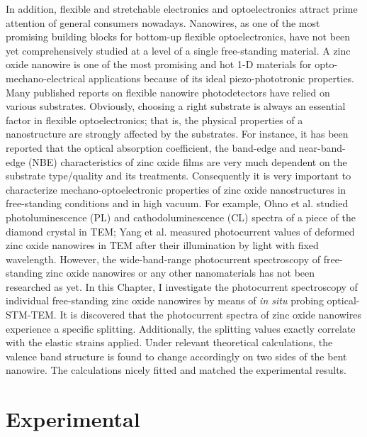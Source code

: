 In addition, flexible and stretchable electronics and optoelectronics attract prime attention of general consumers nowadays. 
Nanowires, as one of the most promising building blocks for bottom-up flexible optoelectronics, have not been yet comprehensively studied at a level of a single free-standing material. 
A zinc oxide nanowire is one of the most promising and hot 1-D materials for opto-mechano-electrical applications because of its ideal piezo-phototronic properties.\cite{L.2011a,L.2010,Xu2015b,L.2010a} 
Many published reports on flexible nanowire photodetectors have relied on various substrates.\cite{G.2015,H.2014,G.2014} 
Obviously, choosing a right substrate is always an essential factor in flexible optoelectronics; that is, the physical properties of a nanostructure are strongly affected by the substrates. 
For instance, it has been reported that the optical absorption coefficient, the band-edge and near-band-edge (NBE) characteristics of zinc oxide films are very much dependent on the substrate type/quality and its treatments.\cite{R.1997} 
Consequently it is very important to characterize mechano-optoelectronic properties of zinc oxide nanostructures in free-standing conditions and in high vacuum. 
For example, Ohno et al. studied photoluminescence (PL) and cathodoluminescence (CL) spectra of a piece of the diamond crystal in TEM;\cite{S.1995} 
Yang et al. measured photocurrent values of deformed zinc oxide nanowires in TEM after their illumination by light with fixed wavelength.\cite{E.2012} 
However, the wide-band-range photocurrent spectroscopy of free-standing zinc oxide nanowires or any other nanomaterials has not been researched as yet. 
In this Chapter, I investigate the photocurrent spectroscopy of individual free-standing zinc oxide nanowires by means of {\em in situ} probing optical-STM-TEM. 
It is discovered that the photocurrent spectra of zinc oxide nanowires experience a specific splitting. Additionally, the splitting values exactly correlate with the elastic strains applied. 
Under relevant theoretical calculations, the valence band structure is found to change accordingly on two sides of the bent nanowire. The calculations nicely fitted and matched the experimental results. 

\section{Experimental}

